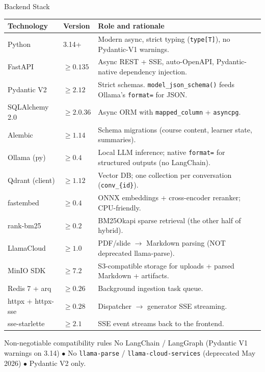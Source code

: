 \documentclass[aspectratio=169, 10pt]{beamer}
\begin{document}
\begin{frame}{Backend Stack}
  \tiny
  \renewcommand{\arraystretch}{1.15}
  \begin{tabular}{p{2.8cm} p{1.5cm} p{8.5cm}}
    \toprule
    \rowcolor{eduBlue!20}\textbf{Technology} & \textbf{Version} & \textbf{Role and rationale} \\
    \midrule
    Python              & 3.14+   & Modern async, strict typing (\texttt{type[T]}), no Pydantic-V1 warnings. \\
    FastAPI             & $\geq 0.135$ & Async REST + SSE, auto-OpenAPI, Pydantic-native dependency injection. \\
    Pydantic V2         & $\geq 2.12$  & Strict schemas. \texttt{model\_json\_schema()} feeds Ollama's \texttt{format=} for JSON. \\
    SQLAlchemy 2.0      & $\geq 2.0.36$ & Async ORM with \texttt{mapped\_column} + \texttt{asyncpg}. \\
    Alembic             & $\geq 1.14$  & Schema migrations (course content, learner state, summaries). \\
    Ollama (py)         & $\geq 0.4$  & Local LLM inference; native \texttt{format=} for structured outputs (no LangChain). \\
    Qdrant (client)     & $\geq 1.12$ & Vector DB; one collection per conversation (\texttt{conv\_\{id\}}). \\
    fastembed           & $\geq 0.4$  & ONNX embeddings + cross-encoder reranker; CPU-friendly. \\
    rank-bm25           & $\geq 0.2$  & BM25Okapi sparse retrieval (the other half of hybrid). \\
    LlamaCloud          & $\geq 1.0$  & PDF/slide $\to$ Markdown parsing (NOT deprecated llama-parse). \\
    MinIO SDK           & $\geq 7.2$  & S3-compatible storage for uploads + parsed Markdown + artifacts. \\
    Redis 7 + arq       & $\geq 0.26$ & Background ingestion task queue. \\
    httpx + httpx-sse   & $\geq 0.28$ & Dispatcher $\to$ generator SSE streaming. \\
    sse-starlette       & $\geq 2.1$  & SSE event streams back to the frontend. \\
    \bottomrule
  \end{tabular}

  \vspace{0.15cm}
  \begin{alertblock}{Non-negotiable compatibility rules}
    \tiny No LangChain / LangGraph (Pydantic V1 warnings on 3.14) $\bullet$
    No \texttt{llama-parse} / \texttt{llama-cloud-services} (deprecated May 2026) $\bullet$
    Pydantic V2 only.
  \end{alertblock}
\end{frame}
\end{document}
